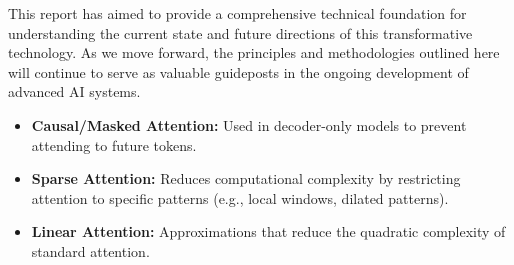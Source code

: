 \documentclass[11pt,a4paper]{report}
\begin{document}
This report has aimed to provide a comprehensive technical foundation for understanding the current state and future directions of this transformative technology. As we move forward, the principles and methodologies outlined here will continue to serve as valuable guideposts in the ongoing development of advanced AI systems.
\begin{itemize}
    \item \textbf{Causal/Masked Attention:} Used in decoder-only models to prevent attending to future tokens.
    
    \item \textbf{Sparse Attention:} Reduces computational complexity by restricting attention to specific patterns (e.g., local windows, dilated patterns).
    
    \item \textbf{Linear Attention:} Approximations that reduce the quadratic complexity of standard attention.
    \end{itemize}
\end{document}
